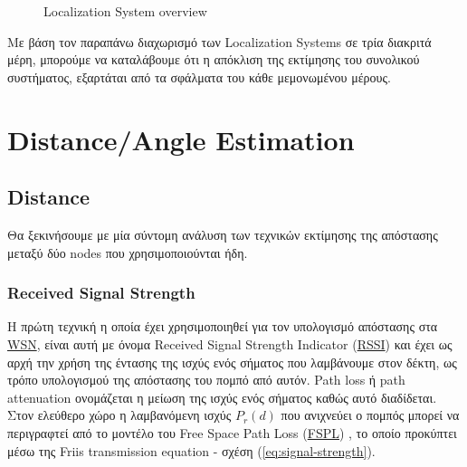 \begin{figure} [H]
{
	}
	\decoRule
	\caption[Localization System overview]{Localization System overview}
	\label{fig:Localization-system}
\end{figure}

Με βάση τον παραπάνω διαχωρισμό των Localization Systems σε τρία διακριτά μέρη, μπορούμε να καταλάβουμε
ότι η απόκλιση της εκτίμησης του συνολικού συστήματος, εξαρτάται από τα σφάλματα  του κάθε μεμονωμένου μέρους.

\section{Distance/Angle Estimation} \label{sec:Chapter2-1} 

\subsection{Distance}\label{sec:Chapter2-1-1}

Θα ξεκινήσουμε με μία σύντομη ανάλυση των τεχνικών εκτίμησης της απόστασης μεταξύ δύο nodes
που χρησιμοποιούνται ήδη. 

\subsubsection{Received Signal Strength}
Η πρώτη τεχνική η οποία έχει χρησιμοποιηθεί για τον υπολογισμό απόστασης στα 
\hyperref[abbr:WSN]{WSN}, είναι αυτή με όνομα Received Signal Strength Indicator
(\hyperref[abbr:RSSI]{RSSI}) και έχει ως αρχή την χρήση της έντασης της ισχύς ενός 
σήματος που λαμβάνουμε στον δέκτη, ως τρόπο υπολογισμού της απόστασης
του πομπό από αυτόν. Path loss ή path attenuation \cite{wikipedia-Path_loss} ονομάζεται η μείωση της ισχύς
ενός σήματος καθώς αυτό διαδίδεται.
Στον ελεύθερο χώρο η λαμβανόμενη ισχύς $P_r(d)$ που ανιχνεύει ο πομπός
μπορεί να περιγραφτεί από το μοντέλο του Free Space Path Loss (\hyperref[abbr:FSPL]{FSPL}) \cite{wikipedia-fspl}, το οποίο προκύπτει
μέσω της Friis transmission equation \cite{wsn-Localization-techniques} \cite{rssi-wlan} \cite{wikipedia-friis-equation} - σχέση (\ref{eq:signal-strength}).

